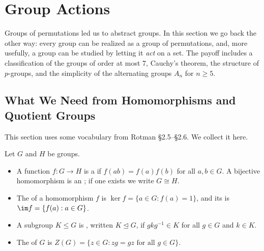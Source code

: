 
\section{Group Actions}

Groups of permutations led us to abstract groups. In this section we go back the other way:
every group can be realized as a group of permutations, and, more usefully, a group can be
studied by letting it \emph{act} on a set. The payoff includes a classification of the
groups of order at most \(7\), Cauchy's theorem, the structure of \(p\)-groups, and the
simplicity of the alternating groups \(A_n\) for \(n \geq 5\).

\subsection{What We Need from Homomorphisms and Quotient Groups}

This section uses some vocabulary from Rotman §2.5--§2.6. We collect it here.

\begin{recall}
	Let \(G\) and \(H\) be groups.
	\begin{itemize}
		\item A function \(f\colon G \to H\) is a  if
		      \(f(ab) = f(a)f(b)\) for all \(a, b \in G\). A bijective homomorphism is an
		      ; if one exists we write \(G \cong H\).
		\item The  of a homomorphism \(f\) is
		      \(\ker f = \{a \in G : f(a) = 1\}\), and its  is
		      \(\im f = \{f(a) : a \in G\}\).
		\item A subgroup \(K \leq G\) is , written \(K \trianglelefteq G\), if
		      \(gkg^{-1} \in K\) for all \(g \in G\) and \(k \in K\).
		\item The  of \(G\) is
		      \(Z(G) = \{z \in G : zg = gz \text{ for all } g \in G\}\).
	\end{itemize}
\end{recall}

